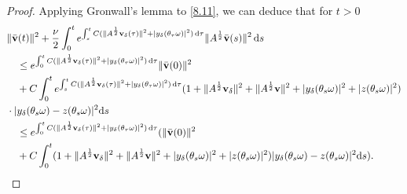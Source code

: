 \documentclass{elsarticle}
\theoremstyle{definition}
\numberwithin{equation}{section}
\renewcommand{\d}{{\rm{d}}}
\begin{document}
\begin{proof}
Applying Gronwall's lemma to \eqref{8.11}, we can  deduce that for $t>0$
\begin{align}\label{8.12}
 & \|\bar{\textbf{v}}(t)\|^2+  \frac{\nu}{2} \int_0^te^{\int_s^tC(\|A^\frac12\textbf{v}_\delta(\tau) \|^2+|y_\delta(\theta_\tau\omega)|^2)\, \d \tau}\|A^{\frac12}\bar{\textbf{v}} (s) \|^2\, \d s \nonumber \\
& \quad
\leq e^{\int_0^tC(\|A^\frac12\textbf{v}_\delta(\tau)\|^2+|y_\delta(\theta_\tau\omega)|^2)\, \d \tau}\|\bar{\textbf{v}}(0)\|^2\nonumber \\
& \quad
+ C\int_0^te^{\int_s^tC(\|A^\frac12\textbf{v}_\delta(\tau) \|^2+|y_\delta(\theta_\tau\omega)|^2)\, \d \tau}(1+\|A^\frac12\textbf{v}_\delta\|^2+\|A^\frac12\textbf{v}\|^2+|y_\delta(\theta_s\omega)|^2
+|z(\theta_s\omega)|^2)\nonumber \\
&\cdot|y_\delta(\theta_s\omega)-z(\theta_s\omega)|^2\d s\nonumber \\
& \quad
\leq e^{\int_0^tC(\|A^\frac12\textbf{v}_\delta(\tau)\|^2+|y_\delta(\theta_\tau\omega)|^2)\, \d \tau}(\|\bar{\textbf{v}}(0)\|^2\nonumber \\
& \quad
+ C\int_0^t(1+\|A^\frac12\textbf{v}_\delta\|^2+\|A^\frac12\textbf{v}\|^2+|y_\delta(\theta_s\omega)|^2
+|z(\theta_s\omega)|^2)|y_\delta(\theta_s\omega)-z(\theta_s\omega)|^2\d s).
\end{align}


\end{proof}
\end{document}
